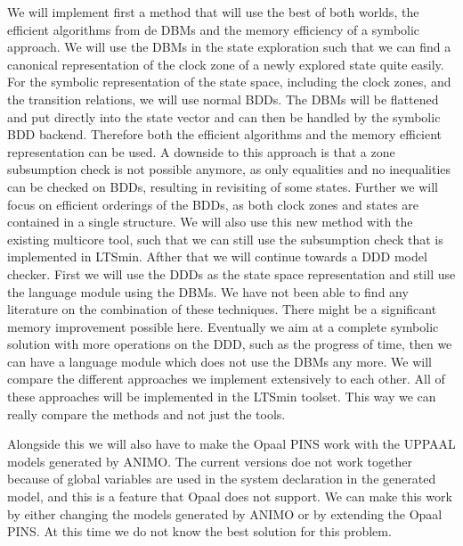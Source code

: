 We will implement first a method that will use the best of both worlds, the efficient algorithms from de DBMs and the memory efficiency of a symbolic approach. We will use the DBMs in the state exploration such that we can find a canonical representation of the clock zone of a newly explored state quite easily. For the symbolic representation of the state space, including the clock zones, and the transition relations, we will use normal BDDs. The DBMs will be flattened and put directly into the state vector and can then be handled by the symbolic BDD backend. Therefore both the efficient algorithms and the memory efficient representation can be used. A downside to this approach is that a zone subsumption check is not possible anymore, as only equalities and no inequalities can be checked on BDDs, resulting in revisiting of some states. Further we will focus on efficient orderings of the BDDs, as both clock zones and states are contained in a single structure. We will also use this new method with the existing multicore tool, such that we can still use the subsumption check that is implemented in LTSmin. Afther that we will continue towards a DDD model checker. First we will use the DDDs as the state space representation and still use the language module using the DBMs. We have not been able to find any literature on the combination of these techniques. There might be a significant memory improvement possible here. Eventually we aim at a complete symbolic solution with more operations on the DDD, such as the progress of time, then we can have a language module which does not use the DBMs any more. We will compare the different approaches we implement extensively to each other. All of these approaches will be implemented in the LTSmin toolset. This way we can really compare the methods and not just the tools.

Alongside this we will also have to make the Opaal PINS work with the UPPAAL models generated by ANIMO. The current versions doe not work together because of global variables are used in the system declaration in the generated model, and this is a feature that Opaal does not support. We can make this work by either changing the models generated by ANIMO or by extending the Opaal PINS. At this time we do not know the best solution for this problem.



